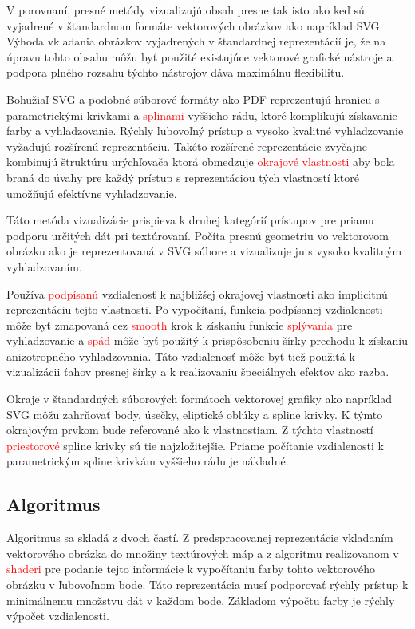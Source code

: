 V porovnaní, presné metódy vizualizujú obsah presne tak isto ako keď sú vyjadrené v štandardnom formáte vektorových obrázkov ako napríklad SVG. Výhoda vkladania obrázkov vyjadrených v štandardnej reprezentácií je, že na úpravu tohto obsahu môžu byť použité existujúce vektorové grafické nástroje a podpora plného rozsahu týchto nástrojov dáva maximálnu flexibilitu.

Bohužiaľ SVG a podobné súborové formáty ako PDF reprezentujú hranicu s parametrickými krivkami a \textcolor{red}{splinami} vyššieho rádu, ktoré komplikujú získavanie farby a vyhladzovanie. Rýchly ľubovoľný prístup a vysoko kvalitné vyhladzovanie vyžadujú rozšírenú reprezentáciu. Takéto rozšírené reprezentácie zvyčajne kombinujú štruktúru urýchľovača ktorá obmedzuje \textcolor{red}{okrajové vlastnosti} aby bola braná do úvahy pre každý prístup s reprezentáciou tých vlastností ktoré umožňujú efektívne vyhladzovanie.

Táto metóda vizualizácie prispieva k druhej kategórií prístupov pre priamu podporu určitých dát pri textúrovaní. Počíta presnú geometriu vo vektorovom obrázku ako je reprezentovaná v SVG súbore a vizualizuje ju s vysoko kvalitným vyhladzovaním.

Používa \textcolor{red}{podpísanú} vzdialenosť k najbližšej okrajovej vlastnosti ako implicitnú reprezentáciu tejto vlastnosti. Po vypočítaní, funkcia podpísanej vzdialenosti môže byť zmapovaná cez \textcolor{red}{smooth} krok k získaniu funkcie \textcolor{red}{splývania} pre vyhladzovanie a \textcolor{red}{spád} môže byť použitý k prispôsobeniu šírky prechodu k získaniu anizotropného vyhladzovania. Táto vzdialenosť môže byť tiež použitá k vizualizácii ťahov presnej šírky a k realizovaniu špeciálnych efektov ako razba.

Okraje v štandardných súborových formátoch vektorovej grafiky ako napríklad SVG môžu zahrňovať body, úsečky, eliptické oblúky a spline krivky. K týmto okrajovým prvkom bude referované ako k vlastnostiam. Z týchto vlastností \textcolor{red}{priestorové} spline krivky sú tie najzložitejšie. Priame počítanie vzdialenosti k parametrickým spline krivkám vyššieho rádu je nákladné.

\subsection{Algoritmus}

Algoritmus sa skladá z dvoch častí. Z predspracovanej reprezentácie vkladaním vektorového obrázka do množiny textúrových máp a z algoritmu realizovanom v \textcolor{red}{shaderi} pre podanie tejto informácie k vypočítaniu farby tohto vektorového obrázku v ľubovoľnom bode. Táto reprezentácia musí podporovať rýchly prístup k minimálnemu množstvu dát v každom bode. Základom výpočtu farby je rýchly výpočet vzdialenosti.

